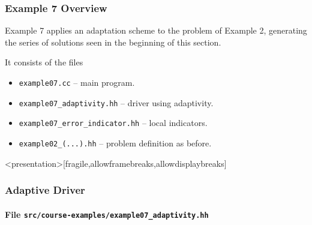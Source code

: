 \begin{frame}
  \frametitle{Example 7 Overview}

  Example 7 applies an adaptation scheme to the problem of Example 2, generating the series of solutions seen in the beginning of this section.

  It consists of the files
  \begin{itemize}
    \item \lstinline{example07.cc} -- main program.
    \item \lstinline{example07_adaptivity.hh} -- driver using adaptivity.
    \item \lstinline{example07_error_indicator.hh} -- local indicators.
    \item \lstinline{example02_(...).hh} -- problem definition as before.
  \end{itemize}
\end{frame}

\begin{frame}<presentation>[fragile,allowframebreaks,allowdisplaybreaks]
  \frametitle<presentation>{Adaptive Driver}
  \framesubtitle<presentation>{File \texttt{src/course-examples/example07\_adaptivity.hh}}
  
\end{frame}

